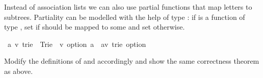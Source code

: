 %
\begin{isabellebody}%
\def\isabellecontext{Trie{\isadigit{3}}}%
\isamarkupfalse%
%
\begin{isamarkuptext}%
Instead of association lists we can also use partial functions
that map letters to subtrees. Partiality can be modelled with the help
of type : if  is a function of type
\mbox{}, set 
if  should be mapped to some  and set  otherwise.%
\end{isamarkuptext}%
\isamarkuptrue%
\ {\isacharparenleft}{\isacharprime}a{\isacharcomma}\ {\isacharprime}v{\isacharparenright}\ trie\ {\isacharequal}\ Trie\ \ {\isachardoublequote}{\isacharprime}v\ option{\isachardoublequote}\ {\isachardoublequote}{\isacharprime}a\ {\isasymRightarrow}\ {\isacharparenleft}{\isacharprime}a{\isacharcomma}{\isacharprime}v{\isacharparenright}\ trie\ option{\isachardoublequote}\isamarkupfalse%
%
\begin{isamarkuptext}%
Modify the definitions of  and 
accordingly and show the same correctness theorem as above.%
\end{isamarkuptext}%
\isamarkuptrue%
\isamarkupfalse%
\end{isabellebody}%
